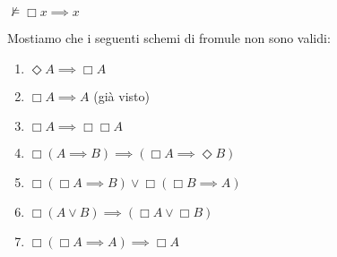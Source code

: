 \documentclass[a4paper,12pt]{article}
\theoremstyle{def}
\theoremstyle{prop}
\theoremstyle{esempio}
\theoremstyle{dimostrazione}
\theoremstyle{teo}
\theoremstyle{osservazione}
\begin{document}
\begin{center}
	\(\nvDash \Box x \implies x\)
\end{center}
Mostiamo che i seguenti schemi di fromule non sono validi:
\begin{enumerate}
	\item \(\Diamond A \implies \Box A\)
	\item \(\Box A \implies A\) (già visto)
	\item \(\Box A \implies \Box \Box A\)
	\item \(\Box (A \implies B) \implies (\Box A \implies \Diamond B)\)
	\item \(\Box (\Box A \implies B) \lor \Box (\Box B \implies A)\)
	\item \(\Box (A \lor B) \implies (\Box A \lor \Box B)\)
	\item \(\Box(\Box A \implies A) \implies \Box A\)
\end{enumerate}
\newpage
\end{document}
